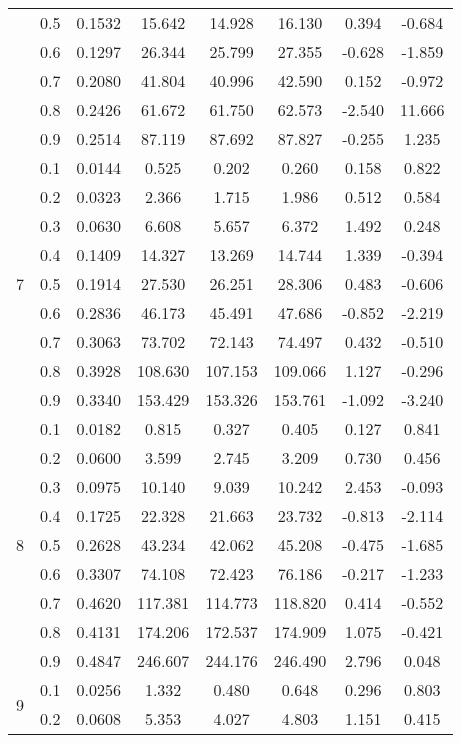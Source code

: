 \documentclass[11pt,a4paper]{report}
\begin{document}
\begin{longtable}{ | c | c || c | c | c | c | c | c | }
 & 0.5 & 0.1532 & 15.642 & 14.928 & 16.130 & 0.394 & -0.684 \\
 & 0.6 & 0.1297 & 26.344 & 25.799 & 27.355 & -0.628 & -1.859 \\
 & 0.7 & 0.2080 & 41.804 & 40.996 & 42.590 & 0.152 & -0.972 \\
 & 0.8 & 0.2426 & 61.672 & 61.750 & 62.573 & -2.540 & 11.666 \\
 & 0.9 & 0.2514 & 87.119 & 87.692 & 87.827 & -0.255 & 1.235 \\
 \hline
\multirow{9}{*}{7} & 0.1 & 0.0144 & 0.525 & 0.202 & 0.260 & 0.158 & 0.822 \\
 & 0.2 & 0.0323 & 2.366 & 1.715 & 1.986 & 0.512 & 0.584 \\
 & 0.3 & 0.0630 & 6.608 & 5.657 & 6.372 & 1.492 & 0.248 \\
 & 0.4 & 0.1409 & 14.327 & 13.269 & 14.744 & 1.339 & -0.394 \\
 & 0.5 & 0.1914 & 27.530 & 26.251 & 28.306 & 0.483 & -0.606 \\
 & 0.6 & 0.2836 & 46.173 & 45.491 & 47.686 & -0.852 & -2.219 \\
 & 0.7 & 0.3063 & 73.702 & 72.143 & 74.497 & 0.432 & -0.510 \\
 & 0.8 & 0.3928 & 108.630 & 107.153 & 109.066 & 1.127 & -0.296 \\
 & 0.9 & 0.3340 & 153.429 & 153.326 & 153.761 & -1.092 & -3.240 \\
 \hline
\multirow{9}{*}{8} & 0.1 & 0.0182 & 0.815 & 0.327 & 0.405 & 0.127 & 0.841 \\
 & 0.2 & 0.0600 & 3.599 & 2.745 & 3.209 & 0.730 & 0.456 \\
 & 0.3 & 0.0975 & 10.140 & 9.039 & 10.242 & 2.453 & -0.093 \\
 & 0.4 & 0.1725 & 22.328 & 21.663 & 23.732 & -0.813 & -2.114 \\
 & 0.5 & 0.2628 & 43.234 & 42.062 & 45.208 & -0.475 & -1.685 \\
 & 0.6 & 0.3307 & 74.108 & 72.423 & 76.186 & -0.217 & -1.233 \\
 & 0.7 & 0.4620 & 117.381 & 114.773 & 118.820 & 0.414 & -0.552 \\
 & 0.8 & 0.4131 & 174.206 & 172.537 & 174.909 & 1.075 & -0.421 \\
 & 0.9 & 0.4847 & 246.607 & 244.176 & 246.490 & 2.796 & 0.048 \\
 \hline
\multirow{9}{*}{9} & 0.1 & 0.0256 & 1.332 & 0.480 & 0.648 & 0.296 & 0.803 \\
 & 0.2 & 0.0608 & 5.353 & 4.027 & 4.803 & 1.151 & 0.415 \\

\end{longtable}
\end{document}
